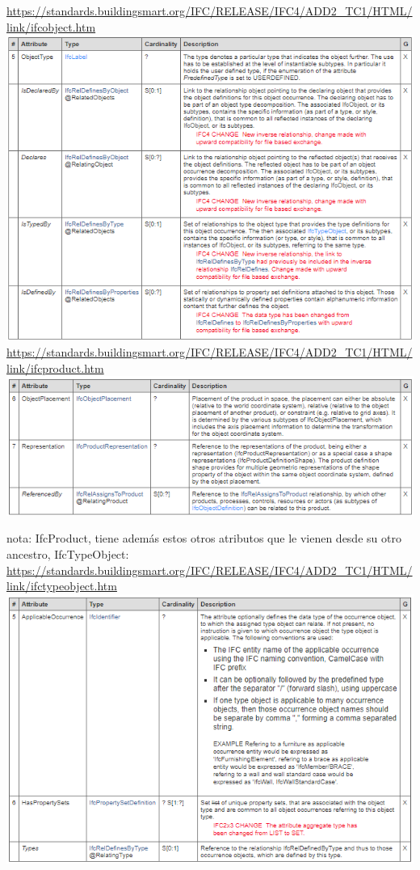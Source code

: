 \documentclass[spanish,12pt,a4paper,final,oneside]{book}
\begin{document}
\url{https://standards.buildingsmart.org/IFC/RELEASE/IFC4/ADD2_TC1/HTML/link/ifcobject.htm}
\\ \includegraphics[width=\textwidth]{atributos de IfcObject}
\\ \url{https://standards.buildingsmart.org/IFC/RELEASE/IFC4/ADD2_TC1/HTML/link/ifcproduct.htm}
\\ \includegraphics[width=\textwidth]{atributos de IfcProduct}

nota: IfcProduct, tiene además estos otros atributos que le vienen desde su otro ancestro, IfcTypeObject:
\\ \url{https://standards.buildingsmart.org/IFC/RELEASE/IFC4/ADD2_TC1/HTML/link/ifctypeobject.htm}
\\ \includegraphics[width=\textwidth]{atributos de IfcTypeObject}
\end{document}
